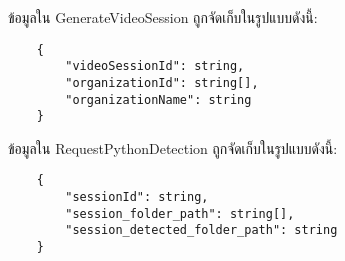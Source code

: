 ข้อมูลใน GenerateVideoSession ถูกจัดเก็บในรูปแบบดังนี้:
\begin{lstlisting}
    {
        "videoSessionId": string,
        "organizationId": string[],
        "organizationName": string
    }
\end{lstlisting}

\clearpage

ข้อมูลใน RequestPythonDetection ถูกจัดเก็บในรูปแบบดังนี้:
\begin{lstlisting}
    {
        "sessionId": string,
        "session_folder_path": string[],
        "session_detected_folder_path": string
    }
\end{lstlisting}
\fi